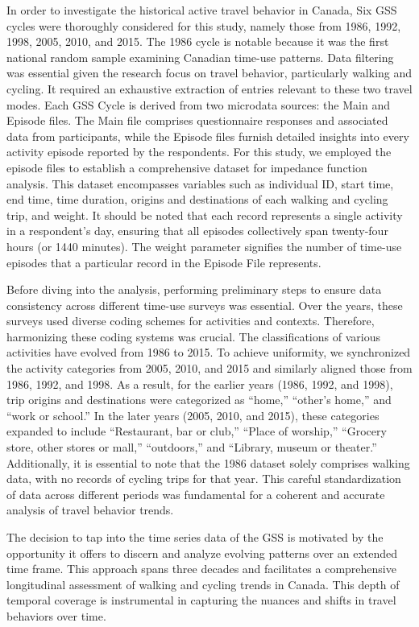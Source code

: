 \documentclass[12pt,twoside]{reedthesis}
\begin{document}
In order to investigate the historical active travel behavior in Canada, Six GSS cycles were thoroughly considered for this study, namely those from 1986, 1992, 1998, 2005, 2010, and 2015. The 1986 cycle is notable because it was the first national random sample examining Canadian time-use patterns. Data filtering was essential given the research focus on travel behavior, particularly walking and cycling. It required an exhaustive extraction of entries relevant to these two travel modes. Each GSS Cycle is derived from two microdata sources: the Main and Episode files. The Main file comprises questionnaire responses and associated data from participants, while the Episode files furnish detailed insights into every activity episode reported by the respondents. For this study, we employed the episode files to establish a comprehensive dataset for impedance function analysis. This dataset encompasses variables such as individual ID, start time, end time, time duration, origins and destinations of each walking and cycling trip, and weight. It should be noted that each record represents a single activity in a respondent's day, ensuring that all episodes collectively span twenty-four hours (or 1440 minutes). The weight parameter signifies the number of time-use episodes that a particular record in the Episode File represents.

Before diving into the analysis, performing preliminary steps to ensure data consistency across different time-use surveys was essential. Over the years, these surveys used diverse coding schemes for activities and contexts. Therefore, harmonizing these coding systems was crucial. The classifications of various activities have evolved from 1986 to 2015. To achieve uniformity, we synchronized the activity categories from 2005, 2010, and 2015 and similarly aligned those from 1986, 1992, and 1998. As a result, for the earlier years (1986, 1992, and 1998), trip origins and destinations were categorized as ``home,'' ``other's home,'' and ``work or school.'' In the later years (2005, 2010, and 2015), these categories expanded to include ``Restaurant, bar or club,'' ``Place of worship,'' ``Grocery store, other stores or mall,'' ``outdoors,'' and ``Library, museum or theater.'' Additionally, it is essential to note that the 1986 dataset solely comprises walking data, with no records of cycling trips for that year. This careful standardization of data across different periods was fundamental for a coherent and accurate analysis of travel behavior trends.

The decision to tap into the time series data of the GSS is motivated by the opportunity it offers to discern and analyze evolving patterns over an extended time frame. This approach spans three decades and facilitates a comprehensive longitudinal assessment of walking and cycling trends in Canada. This depth of temporal coverage is instrumental in capturing the nuances and shifts in travel behaviors over time.
\end{document}
